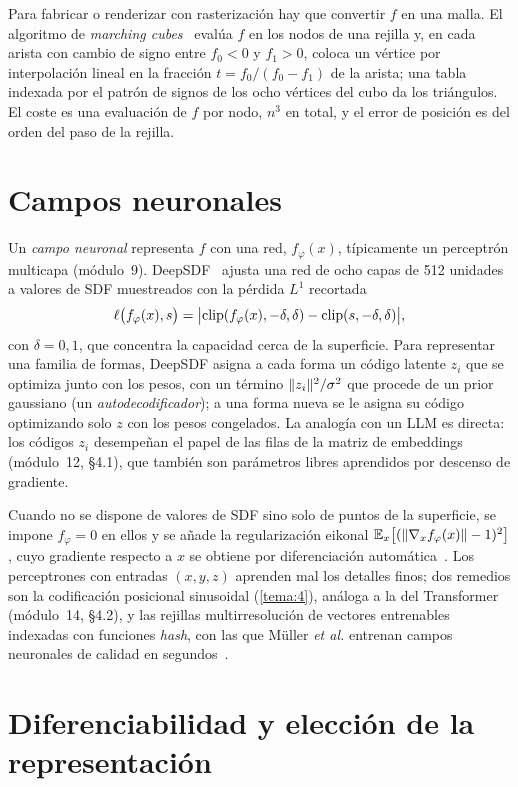 Para fabricar o renderizar con rasterización hay que convertir $f$ en una malla. El algoritmo de \emph{marching cubes}~\cite{mc} evalúa $f$ en los nodos de una rejilla y, en cada arista con cambio de signo entre $f_0<0$ y $f_1>0$, coloca un vértice por interpolación lineal en la fracción $t=f_0/(f_0-f_1)$ de la arista; una tabla indexada por el patrón de signos de los ocho vértices del cubo da los triángulos. El coste es una evaluación de $f$ por nodo, $n^3$ en total, y el error de posición es del orden del paso de la rejilla.

\section{Campos neuronales}

Un \emph{campo neuronal} representa $f$ con una red, $f_\varphi(x)$, típicamente un perceptrón multicapa (módulo~9). DeepSDF~\cite{deepsdf} ajusta una red de ocho capas de 512 unidades a valores de SDF muestreados con la pérdida $L^1$ recortada
\[
\ell\bigl(f_\varphi(x),s\bigr)=\bigl\lvert\operatorname{clip}(f_\varphi(x),-\delta,\delta)-\operatorname{clip}(s,-\delta,\delta)\bigr\rvert,
\]
con $\delta=0{,}1$, que concentra la capacidad cerca de la superficie. Para representar una familia de formas, DeepSDF asigna a cada forma un código latente $z_i$ que se optimiza junto con los pesos, con un término $\lVert z_i\rVert^2/\sigma^2$ que procede de un prior gaussiano (un \emph{autodecodificador}); a una forma nueva se le asigna su código optimizando solo $z$ con los pesos congelados. La analogía con un LLM es directa: los códigos $z_i$ desempeñan el papel de las filas de la matriz de embeddings (módulo~12, §4.1), que también son parámetros libres aprendidos por descenso de gradiente.

Cuando no se dispone de valores de SDF sino solo de puntos de la superficie, se impone $f_\varphi=0$ en ellos y se añade la regularización eikonal $\mathbb{E}_x\bigl[(\lVert\nabla_xf_\varphi(x)\rVert-1)^2\bigr]$, cuyo gradiente respecto a $x$ se obtiene por diferenciación automática~\cite{cs348nhw2}. Los perceptrones con entradas $(x,y,z)$ aprenden mal los detalles finos; dos remedios son la codificación posicional sinusoidal (\cref{tema:4}), análoga a la del Transformer (módulo~14, §4.2), y las rejillas multirresolución de vectores entrenables indexadas con funciones \emph{hash}, con las que Müller \emph{et al.} entrenan campos neuronales de calidad en segundos~\cite{ingp}.

\section{Diferenciabilidad y elección de la representación}

